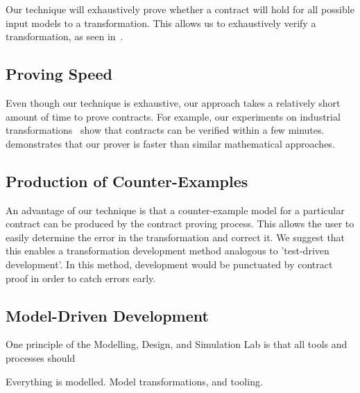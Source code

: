 Our technique will exhaustively prove whether a contract will hold for all possible input models to a transformation. This allows us to exhaustively verify a transformation, as seen in~\cite{Lucio2014}.

\subsection{Proving Speed}

 Even though our technique is exhaustive, our approach takes a relatively short amount of time to prove contracts. For example, our experiments on industrial transformations~\cite{Oakes} show that contracts can be verified within a few minutes. \cite{Selim2014} demonstrates that our prover is faster than similar mathematical approaches.

\subsection{Production of Counter-Examples}

An advantage of our technique is that a counter-example model for a particular contract can be produced by the contract proving process. This allows the user to easily determine the error in the transformation and correct it. We suggest that this enables a transformation development method analogous to 'test-driven development'. In this method, development would be punctuated by contract proof in order to catch errors early.


\subsection{Model-Driven Development}

One principle of the Modelling, Design, and Simulation Lab is that all tools and processes should 

Everything is modelled. Model transformations, and tooling.
 